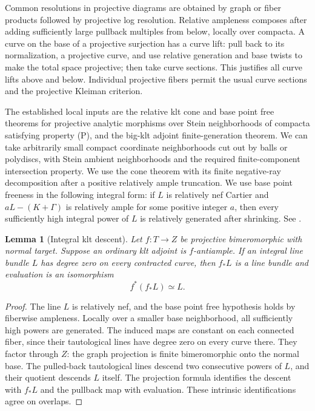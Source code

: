 \documentclass[11pt,letterpaper]{article}
\newtheorem{lemma}[theorem]{Lemma}
\theoremstyle{definition}
\theoremstyle{remark}
\begin{document}
Common resolutions in projective diagrams are obtained by graph or
fiber products followed by projective log resolution.  Relative
ampleness composes after adding sufficiently large pullback multiples
from below, locally over compacta.  A curve on the base of a
projective surjection has a curve lift: pull back to its normalization,
a projective curve, and use relative generation and base twists to
make the total space projective; then take curve sections.  This
justifies all curve lifts above and below.  Individual projective
fibers permit the usual curve sections and the projective Kleiman
criterion.

The established local inputs are the relative klt cone and base point
free theorems for projective analytic morphisms over Stein
neighborhoods of compacta satisfying property (P), and the big-klt
adjoint finite-generation theorem.  We can take arbitrarily small
compact coordinate neighborhoods cut out by balls or polydiscs, with
Stein ambient neighborhoods and the required finite-component
intersection property.  We use the cone theorem with its finite
negative-ray decomposition after a positive relatively ample
truncation.  We use base point freeness in the following integral
form: if $L$ is relatively nef Cartier and
$aL-(K+\Gamma)$ is relatively ample for some positive integer $a$,
then every sufficiently high integral power of $L$ is relatively
generated after shrinking.  See
\cite[Theorems~6.2, 6.5, and 7.2]{FujinoAnalyticMMP}.

\begin{lemma}[Integral klt descent]
\label{bir:integral-descent}
Let $f:T\to Z$ be projective bimeromorphic with normal target.  Suppose
an ordinary klt adjoint is $f$-antiample.  If an integral line bundle
$L$ has degree zero on every contracted curve, then $f_*L$ is a line
bundle and evaluation is an isomorphism
\begin{equation}
 f^*(f_*L)\simeq L.
 \label{bir:integral-pullback}
\end{equation}
\end{lemma}

\begin{proof}
The line $L$ is relatively nef, and the base point free hypothesis
holds by fiberwise ampleness.  Locally over a smaller base neighborhood,
all sufficiently high powers are generated.  The induced maps are
constant on each connected fiber, since their tautological lines have
degree zero on every curve there.  They factor through $Z$: the graph
projection is finite bimeromorphic onto the normal base.  The pulled-back
tautological lines descend two consecutive powers of $L$, and their
quotient descends $L$ itself.  The projection formula identifies the
descent with $f_*L$ and the pullback map with evaluation.  These
intrinsic identifications agree on overlaps.
\end{proof}
\end{document}
